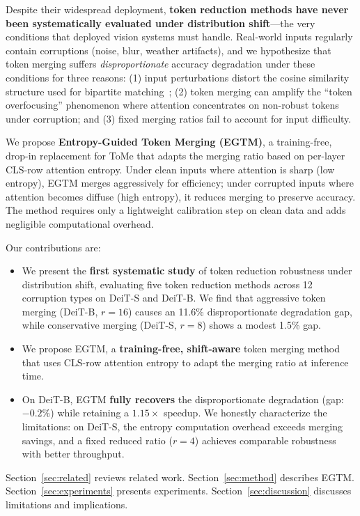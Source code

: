 \documentclass{article}
\newcommand{\ours}{EGTM}
\begin{document}
Despite their widespread deployment, \textbf{token reduction methods have never been systematically evaluated under distribution shift}---the very conditions that deployed vision systems must handle. Real-world inputs regularly contain corruptions (noise, blur, weather artifacts), and we hypothesize that token merging suffers \emph{disproportionate} accuracy degradation under these conditions for three reasons: (1) input perturbations distort the cosine similarity structure used for bipartite matching~\citep{guo2023robustifying}; (2) token merging can amplify the ``token overfocusing'' phenomenon where attention concentrates on non-robust tokens under corruption; and (3) fixed merging ratios fail to account for input difficulty.

We propose \textbf{Entropy-Guided Token Merging (\ours{})}, a training-free, drop-in replacement for ToMe that adapts the merging ratio based on per-layer CLS-row attention entropy. Under clean inputs where attention is sharp (low entropy), \ours{} merges aggressively for efficiency; under corrupted inputs where attention becomes diffuse (high entropy), it reduces merging to preserve accuracy. The method requires only a lightweight calibration step on clean data and adds negligible computational overhead.

Our contributions are:
\begin{itemize}
    \item We present the \textbf{first systematic study} of token reduction robustness under distribution shift, evaluating five token reduction methods across 12 corruption types on DeiT-S and DeiT-B. We find that aggressive token merging (DeiT-B, $r{=}16$) causes an 11.6\% disproportionate degradation gap, while conservative merging (DeiT-S, $r{=}8$) shows a modest 1.5\% gap.
    \item We propose \ours{}, a \textbf{training-free, shift-aware} token merging method that uses CLS-row attention entropy to adapt the merging ratio at inference time.
    \item On DeiT-B, \ours{} \textbf{fully recovers} the disproportionate degradation (gap: $-0.2\%$) while retaining a $1.15\times$ speedup. We honestly characterize the limitations: on DeiT-S, the entropy computation overhead exceeds merging savings, and a fixed reduced ratio ($r{=}4$) achieves comparable robustness with better throughput.
\end{itemize}

Section~\ref{sec:related} reviews related work. Section~\ref{sec:method} describes \ours{}. Section~\ref{sec:experiments} presents experiments. Section~\ref{sec:discussion} discusses limitations and implications.
\end{document}
